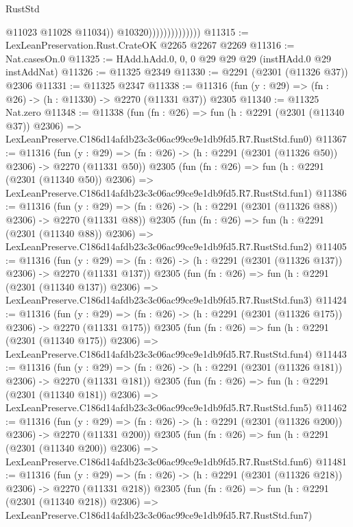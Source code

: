 \begin{lexlean}{RustStd}
\begin{coremodule}
                                    @11023
                                    @11028
                                    @11034))
                                @10320))))))))))))))
@11315 := LexLeanPreservation.Rust.CrateOK @2265 @2267 @2269
@11316 := Nat.casesOn.{0}
@11325 := HAdd.hAdd.{0, 0, 0} @29 @29 @29 (instHAdd.{0} @29 instAddNat)
@11326 := @11325 @2349
@11330 := @2291 (@2301 (@11326 @37)) @2306
@11331 := @11325 @2347
@11338 := @11316 (fun (y : @29) => (fn : @26) -> (h : @11330) -> @2270 (@11331 @37)) @2305
@11340 := @11325 Nat.zero
@11348 := @11338
    (fun (fn : @26) =>
    fun (h : @2291 (@2301 (@11340 @37)) @2306) =>
    LexLeanPreserve.C186d14afdb23c3c06ac99ce9e1db9fd5.R7.RustStd.fun0)
@11367 := @11316
    (fun (y : @29) => (fn : @26) -> (h : @2291 (@2301 (@11326 @50)) @2306) -> @2270 (@11331 @50))
    @2305
    (fun (fn : @26) =>
    fun (h : @2291 (@2301 (@11340 @50)) @2306) =>
    LexLeanPreserve.C186d14afdb23c3c06ac99ce9e1db9fd5.R7.RustStd.fun1)
@11386 := @11316
    (fun (y : @29) => (fn : @26) -> (h : @2291 (@2301 (@11326 @88)) @2306) -> @2270 (@11331 @88))
    @2305
    (fun (fn : @26) =>
    fun (h : @2291 (@2301 (@11340 @88)) @2306) =>
    LexLeanPreserve.C186d14afdb23c3c06ac99ce9e1db9fd5.R7.RustStd.fun2)
@11405 := @11316
    (fun (y : @29) => (fn : @26) -> (h : @2291 (@2301 (@11326 @137)) @2306) -> @2270 (@11331 @137))
    @2305
    (fun (fn : @26) =>
    fun (h : @2291 (@2301 (@11340 @137)) @2306) =>
    LexLeanPreserve.C186d14afdb23c3c06ac99ce9e1db9fd5.R7.RustStd.fun3)
@11424 := @11316
    (fun (y : @29) => (fn : @26) -> (h : @2291 (@2301 (@11326 @175)) @2306) -> @2270 (@11331 @175))
    @2305
    (fun (fn : @26) =>
    fun (h : @2291 (@2301 (@11340 @175)) @2306) =>
    LexLeanPreserve.C186d14afdb23c3c06ac99ce9e1db9fd5.R7.RustStd.fun4)
@11443 := @11316
    (fun (y : @29) => (fn : @26) -> (h : @2291 (@2301 (@11326 @181)) @2306) -> @2270 (@11331 @181))
    @2305
    (fun (fn : @26) =>
    fun (h : @2291 (@2301 (@11340 @181)) @2306) =>
    LexLeanPreserve.C186d14afdb23c3c06ac99ce9e1db9fd5.R7.RustStd.fun5)
@11462 := @11316
    (fun (y : @29) => (fn : @26) -> (h : @2291 (@2301 (@11326 @200)) @2306) -> @2270 (@11331 @200))
    @2305
    (fun (fn : @26) =>
    fun (h : @2291 (@2301 (@11340 @200)) @2306) =>
    LexLeanPreserve.C186d14afdb23c3c06ac99ce9e1db9fd5.R7.RustStd.fun6)
@11481 := @11316
    (fun (y : @29) => (fn : @26) -> (h : @2291 (@2301 (@11326 @218)) @2306) -> @2270 (@11331 @218))
    @2305
    (fun (fn : @26) =>
    fun (h : @2291 (@2301 (@11340 @218)) @2306) =>
    LexLeanPreserve.C186d14afdb23c3c06ac99ce9e1db9fd5.R7.RustStd.fun7)

\end{coremodule}
\end{lexlean}
